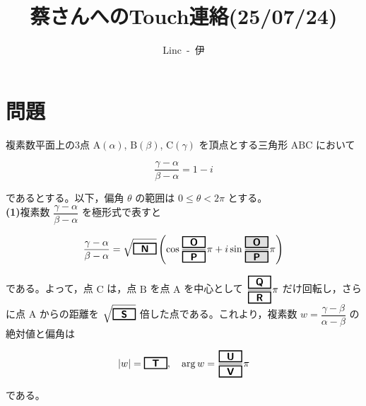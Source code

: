 \documentclass[dvipdfmx,a4paper,12pt]{jarticle}
\title{\vspace{-3cm} 蔡さんへのTouch連絡(25/07/24)}  %
\author{Linc\ -\ 伊}  %
\date{}  %
\theoremstyle{mystyle}
\newcommand{\abb}[1]{%
\begin{tikzpicture}[baseline]
\node[draw=black, 
      rectangle, 
      minimum width=0.8cm, 
      minimum height=0.3cm, 
      fill=gray!25, 
      font=\bfseries,
      line width=1pt,
      inner sep=2pt,
      anchor=base] {#1};
\end{tikzpicture}%
}
\newcommand{\ab}[1]{%
\begin{tikzpicture}[baseline]
\node[draw=black, 
      rectangle, 
      minimum width=0.8cm, 
      minimum height=0.3cm, 
      font=\bfseries,
      line width=1pt,
      inner sep=2pt,
      anchor=base] {$#1$};
\end{tikzpicture}%
}
\begin{document}
\maketitle
\section*{\textbf{問題}}
\noindent
複素数平面上の3点 $\mathrm{A}(\alpha)$, $\mathrm{B}(\beta)$, $\mathrm{C}(\gamma)$ を頂点とする三角形 $\mathrm{ABC}$ において

$$\frac{\gamma - \alpha}{\beta - \alpha} = 1 - i$$

であるとする。以下，偏角 $\theta$ の範囲は $0 \leq \theta < 2\pi$ とする。\\


\textbf{(1)}\quad 複素数 $\dfrac{\gamma - \alpha}{\beta - \alpha}$ を極形式で表すと

$$\dfrac{\gamma - \alpha}{\beta - \alpha} = \sqrt{\ab{\textsf N}} \left(\cos \dfrac{\ab{\textsf O}}{\ab{\textsf P}} \pi + i \sin \dfrac{\abb{\textsf O}}{\abb{\textsf P}} \pi\right)$$

である。よって，点 $\mathrm{C}$ は，点 $\mathrm{B}$ を点 $\mathrm{A}$ を中心として $\dfrac{\ab{\textsf Q}}{\ab{\textsf R}} \pi$ だけ回転し，さらに点 $\mathrm{A}$ からの距離を $\sqrt{\ab{\textsf S}}$ 倍した点である。これより，複素数 $w = \dfrac{\gamma - \beta}{\alpha - \beta}$ の絶対値と偏角は

$$|w| = \ab{\textsf T}, \quad \arg w = \dfrac{\ab{\textsf U}}{\ab{\textsf V}} \pi$$

\noindent
である。\\
\end{document}
